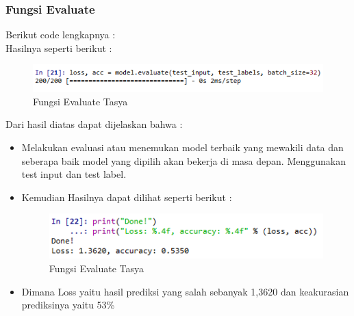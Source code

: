 \begin{enumerate}
\begin{itemize}
\subsubsection{Fungsi Evaluate}
Berikut code lengkapnya : \\

Hasilnya seperti berikut :\\
\begin{figure}[ht]
\centering
\includegraphics[scale=0.5]{figures/chapter6tasya20.png}
\caption{Fungsi Evaluate Tasya}
\label{Praktek}
\end{figure}
Dari hasil diatas dapat dijelaskan bahwa :\\
\begin{itemize}
\item Melakukan evaluasi atau  menemukan model terbaik yang mewakili data dan seberapa baik model yang dipilih akan bekerja di masa depan. Menggunakan test input dan test label.
\item Kemudian Hasilnya dapat dilihat seperti berikut :
\begin{figure}[ht]
\centering
\includegraphics[scale=0.5]{figures/chapter6tasya21.png}
\caption{Fungsi Evaluate Tasya}
\label{Praktek}
\end{figure}
\item Dimana Loss yaitu hasil prediksi yang salah sebanyak 1,3620 dan keakurasian prediksinya yaitu 53\%
\end{itemize}


\end{itemize}
\end{enumerate}
